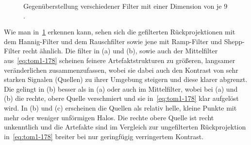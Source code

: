 \documentclass[slug=PET, room=Andreas-Schubert-Bau\,\ 424A, supervisor=Carsten\ Bittrich, coursedate=10.\ 01.\ 2020]{../../Lab_Report_LaTeX/lab_report}
\begin{document}
\begin{figure}[h]
  \centering
  \caption{Gegenüberstellung verschiedener Filter mit einer Dimension
    von je \(9\).}
  \label{fig:filter}
\end{figure}

Wie man in~\ref{fig:filter} erkennen kann, sehen sich die gefilterten
Rückprojektionen mit dem Hannig-Filter und dem Rauschfilter sowie jene
mit Ramp-Filter und Shepp-Filter recht ähnlich. Die filter in (a) und
(b), sowie auch der Mittelfilter aus~\eqref{eq:tom1-178} scheinen
feinere Artefaktstrukturen zu gr\"o\ss{}eren, langsamer
ver\"anderlichen zusammenzufassen, wobei sie dabei auch den Kontrast von
sehr starken Signalen (Quellen) zu ihrer Umgebung steigern und diese
klarer abgrenzt. Die gelingt in (b) besser als in (a) oder auch im
Mittelfilter, wobei bei (a) und (b) die rechte, obere Quelle
verschmiert und sie in~\eqref{eq:tom1-178} klar aufgel\"ost wird. In (b)
und (c) erscheinen die Quellen als relativ helle, kleine Punkte mit
mehr oder weniger unf\"ormigen Halos. Die rechte obere Quelle ist
recht unkenntlich und die Artefakte sind im Vergleich zur
ungefilterten R\"uckprojektion in~\eqref{eq:tom1-178} breiter bei nur
geringf\"ugig verringertem Kontrast. \\
\end{document}
